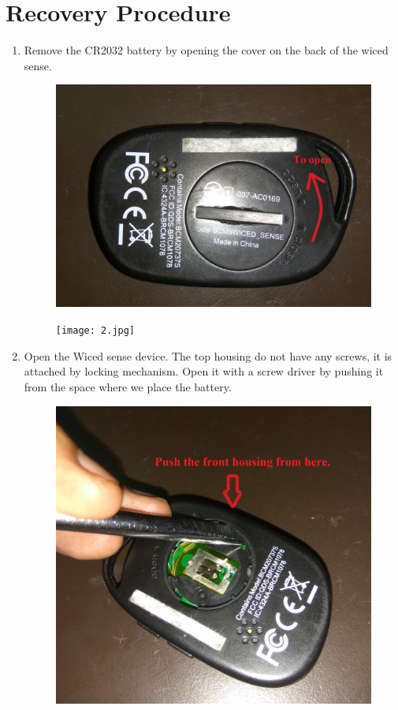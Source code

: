 \documentclass[11pt,a4paper]{article}
\begin{document}
\section{Recovery Procedure}
	\begin{enumerate}
	  \item Remove the CR2032 battery by opening the cover on the back of the wiced sense.
	  \begin{figure}[h]
        \centering
    	\includegraphics[scale=0.05]{1.jpg}
	    \end{figure}
	     \begin{figure}[h]
        \centering
    	\texttt{[image: 2.jpg]}
	    \end{figure}
	  \item Open the Wiced sense device. The top housing do not have any screws, it is attached by locking mechanism. Open it with a screw driver by pushing it from the space where we place the battery.
	  
	   \begin{figure}[h]
        \centering
    	\includegraphics[scale=0.05]{3.jpg}
	    \end{figure}
	  

\end{enumerate}
\end{document}
